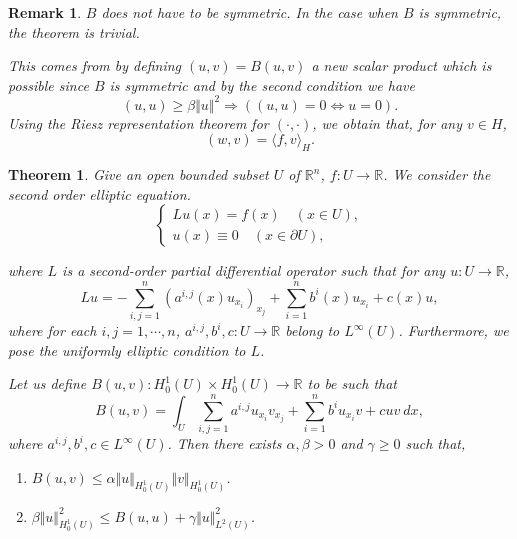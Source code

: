 \documentclass{article}
\newtheorem{theorem}{Theorem}[section]
\newtheorem{remark}{Remark}[section]
\numberwithin{equation}{section}
\begin{document}
\begin{remark}
$B$ does not have to be symmetric. In the case when $B$ is symmetric, the theorem is trivial.\\
\par This comes from by defining $(u,v)=B(u,v)$ a new scalar product which is possible since $B$ is symmetric and by the second condition we have
\begin{equation*}
(u,u)\geq\beta\Vert u\Vert^2\Rightarrow ((u,u)=0\Leftrightarrow u=0).
\end{equation*}
Using the Riesz representation theorem for $(\cdot,\cdot)$, we obtain that, for any $v\in H$, 
\begin{equation*}
(w,v) = \langle f, v\rangle_H.
\end{equation*}
\end{remark}

\begin{theorem}
Give an open bounded subset $U$ of $\mathbb{R}^n$, $f:U\to\mathbb{R}$. We consider the second order elliptic equation.
\begin{equation*}
\begin{cases}
Lu(x)=f(x)\quad (x\in U),\\
u(x)\equiv 0 \quad(x\in\partial U),
\end{cases}
\end{equation*}

where $L$ is a second-order partial differential operator such that for any $u:U\to\mathbb{R}$, 
\begin{equation}
\label{eq:2.1}
Lu = -\sum_{i,j=1}^n (a^{i,j}(x)u_{x_i})_{x_j}+\sum_{i=1}^nb^i(x)u_{x_i}+c(x)u,
\end{equation}
where for each $i,j=1,\cdots,n$, $a^{i,j},b^i,c:U\to\mathbb{R}$ belong to $L^\infty(U)$. 
Furthermore, we pose the uniformly elliptic condition to $L$.\\
\par Let us define $B(u,v):H_0^1(U)\times H_0^1(U)\to\mathbb{R}$ to be such that
\begin{equation*}
B(u,v) = \int_{U} \sum_{i,j=1}^n a^{i,j}u_{x_i}v_{x_j}+\sum_{i=1}^n b^iu_{x_i}v+cuv\:dx,
\end{equation*}
where $a^{i,j},b^i,c\in L^\infty(U)$.
Then there exists $\alpha,\beta>0$ and $\gamma\geq 0$ such that,
\begin{enumerate}[1).]
\item $B(u,v)\leq\alpha\Vert u \Vert_{H_0^1(U)}\Vert v\Vert_{H_0^1(U)}$.
\item $\beta\Vert u \Vert_{H_0^1(U)}^2 \leq B(u,u)+\gamma\Vert u \Vert_{L^2(U)}^2$.
\end{enumerate}
\label{LM_modified}
\end{theorem}
\end{document}
